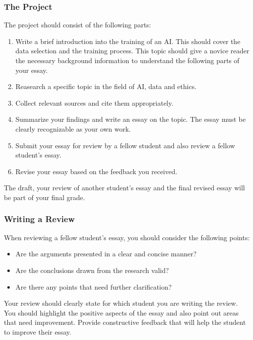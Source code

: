 \documentclass[12pt,a4paper]{report}
\begin{document}
\subsubsection*{The Project}
The project should consist of the following parts:
\renewcommand{\labelenumi}{\arabic{enumi}.}

\begin{enumerate}
    \item Write a brief introduction into the training of an AI. This should cover the data selection and the training process. This topic should give a novice reader the necessary background information to understand the following parts of your essay.
    \item Reasearch  a specific topic in the field of AI, data and ethics. 
    \item Collect relevant sources and cite them appropriately.
    \item Summarize your findings and write an essay on the topic. The essay must be clearly recognizable as your own work.
    \item Submit your essay for review by a fellow student and also review a fellow student's essay.
    \item Revise your essay based on the feedback you received.
\end{enumerate}

The draft, your review of another student's essay and the final revised essay will be part of your final grade.


\subsubsection*{Writing a Review}
When reviewing a fellow student's essay, you should consider the following points:
\begin{itemize}
    \item Are the arguments presented in a clear and concise manner?
    \item Are the conclusions drawn from the research valid?
    \item Are there any points that need further clarification?
\end{itemize}
Your review should clearly state for which student you are writing the review. You should highlight the positive aspects of the essay and also point out areas that need improvement. Provide constructive feedback that will help the student to improve their essay.
\end{document}
